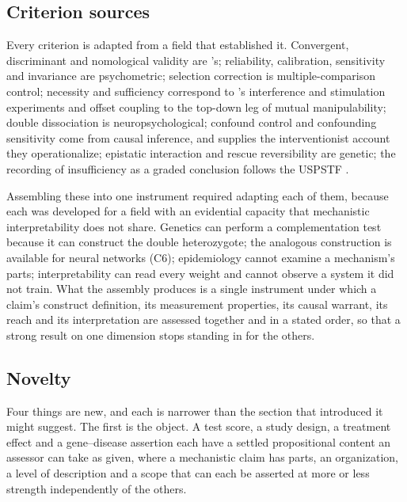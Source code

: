 \documentclass{article}
\begin{document}
\subsection{Criterion sources}
\label{sec:related-sources}

Every criterion is adapted from a field that established it. Convergent, discriminant and nomological validity are \citeauthor{cronbach1955construct}'s; reliability, calibration, sensitivity and invariance are psychometric; selection correction is multiple-comparison control; necessity and sufficiency correspond to \citeauthor{craver2007explaining}'s interference and stimulation experiments and offset coupling to the top-down leg of mutual manipulability; double dissociation is neuropsychological; confound control and confounding sensitivity come from causal inference, and \citet{woodward2003making} supplies the interventionist account they operationalize; epistatic interaction and rescue reversibility are genetic; the recording of insufficiency as a graded conclusion follows the USPSTF \citep{uspstf2021}.

Assembling these into one instrument required adapting each of them, because each was developed for a field with an evidential capacity that mechanistic interpretability does not share. Genetics can perform a complementation test \citep{benzer1955fine} because it can construct the double heterozygote; the analogous construction is available for neural networks (C6); epidemiology cannot examine a mechanism's parts; interpretability can read every weight and cannot observe a system it did not train. What the assembly produces is a single instrument under which a claim's construct definition, its measurement properties, its causal warrant, its reach and its interpretation are assessed together and in a stated order, so that a strong result on one dimension stops standing in for the others.

\subsection{Novelty}
\label{sec:related-novelty}

Four things are new, and each is narrower than the section that introduced it
might suggest.  The first is the object.  A test score, a study design, a
treatment effect and a gene--disease assertion each have a settled propositional
content an assessor can take as given, where a mechanistic claim has parts, an
organization, a level of description and a scope that can each be asserted at
more or less strength independently of the others.
\end{document}
